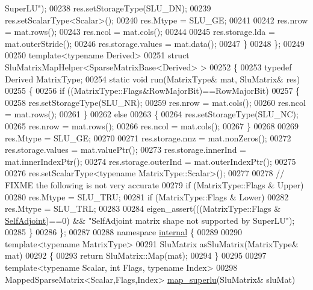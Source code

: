 \begin{DoxyCode}
{       SuperLU"});
00238     res.setStorageType(SLU\_DN);
00239     res.setScalarType<Scalar>();
00240     res.Mtype     = SLU\_GE;
00241 
00242     res.nrow      = mat.rows();
00243     res.ncol      = mat.cols();
00244 
00245     res.storage.lda       = mat.outerStride();
00246     res.storage.values    = mat.data();
00247   \}
00248 \};
00249 
00250 \textcolor{keyword}{template}<\textcolor{keyword}{typename} Derived>
00251 \textcolor{keyword}{struct }SluMatrixMapHelper<SparseMatrixBase<Derived> >
00252 \{
00253   \textcolor{keyword}{typedef} Derived MatrixType;
00254   \textcolor{keyword}{static} \textcolor{keywordtype}{void} run(MatrixType& mat, SluMatrix& res)
00255   \{
00256     \textcolor{keywordflow}{if} ((MatrixType::Flags&RowMajorBit)==RowMajorBit)
00257     \{
00258       res.setStorageType(SLU\_NR);
00259       res.nrow      = mat.cols();
00260       res.ncol      = mat.rows();
00261     \}
00262     \textcolor{keywordflow}{else}
00263     \{
00264       res.setStorageType(SLU\_NC);
00265       res.nrow      = mat.rows();
00266       res.ncol      = mat.cols();
00267     \}
00268 
00269     res.Mtype       = SLU\_GE;
00270 
00271     res.storage.nnz       = mat.nonZeros();
00272     res.storage.values    = mat.valuePtr();
00273     res.storage.innerInd  = mat.innerIndexPtr();
00274     res.storage.outerInd  = mat.outerIndexPtr();
00275 
00276     res.setScalarType<\textcolor{keyword}{typename} MatrixType::Scalar>();
00277 
00278     \textcolor{comment}{// FIXME the following is not very accurate}
00279     \textcolor{keywordflow}{if} (MatrixType::Flags & Upper)
00280       res.Mtype = SLU\_TRU;
00281     \textcolor{keywordflow}{if} (MatrixType::Flags & Lower)
00282       res.Mtype = SLU\_TRL;
00283 
00284     eigen\_assert(((MatrixType::Flags & \hyperlink{group__enums_gga39e3366ff5554d731e7dc8bb642f83cda2491fc6765056421f504eb7e16083e8f}{SelfAdjoint})==0) && \textcolor{stringliteral}{"SelfAdjoint matrix shape not
       supported by SuperLU"});
00285   \}
00286 \};
00287 
00288 \textcolor{keyword}{namespace }\hyperlink{namespaceinternal}{internal} \{
00289 
00290 \textcolor{keyword}{template}<\textcolor{keyword}{typename} MatrixType>
00291 SluMatrix asSluMatrix(MatrixType& mat)
00292 \{
00293   \textcolor{keywordflow}{return} SluMatrix::Map(mat);
00294 \}
00295 
00297 \textcolor{keyword}{template}<\textcolor{keyword}{typename} Scalar, \textcolor{keywordtype}{int} Flags, \textcolor{keyword}{typename} Index>
00298 MappedSparseMatrix<Scalar,Flags,Index> \hyperlink{namespace_eigen_1_1internal_a3623dd66c579fac70fa26a40aae5061b}{map\_superlu}(SluMatrix& sluMat)

\end{DoxyCode}

